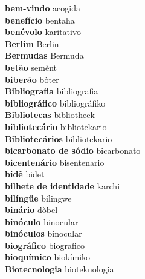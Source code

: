 \textbf{ bem-vindo  } acogida \\
\textbf{ benefício  } bentaha \\
\textbf{ benévolo  } karitativo \\
\textbf{ Berlim  } Berlin \\
\textbf{ Bermudas  } Bermuda \\
\textbf{ betão  } semènt \\
\textbf{ biberão  } bòter \\
\textbf{ Bibliografia  } bibliografia \\
\textbf{ bibliográfico  } bibliográfiko \\
\textbf{ Bibliotecas  } bibliotheek \\
\textbf{ bibliotecário  } bibliotekario \\
\textbf{ Bibliotecários  } bibliotekario \\
\textbf{ bicarbonato de sódio  } bicarbonato \\
\textbf{ bicentenário  } bisentenario \\
\textbf{ bidê  } bidet \\
\textbf{ bilhete de identidade  } karchi \\
\textbf{ bilíngüe  } bilingwe \\
\textbf{ binário  } dòbel \\
\textbf{ binóculo  } binocular \\
\textbf{ binóculos  } binocular \\
\textbf{ biográfico  } biografico \\
\textbf{ bioquímico  } biokímiko \\
\textbf{ Biotecnologia  } bioteknologia \\
